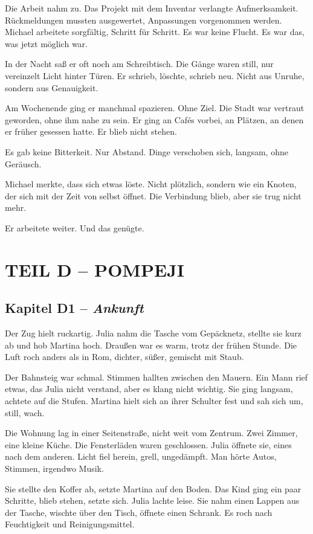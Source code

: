 \documentclass[
]{article}
\begin{document}
Die Arbeit nahm zu. Das Projekt mit dem Inventar verlangte Aufmerksamkeit. Rückmeldungen mussten ausgewertet, Anpassungen vorgenommen werden. Michael arbeitete sorgfältig, Schritt für Schritt. Es war keine Flucht. Es war das, was jetzt möglich war.

In der Nacht saß er oft noch am Schreibtisch. Die Gänge waren still, nur vereinzelt Licht hinter Türen. Er schrieb, löschte, schrieb neu. Nicht aus Unruhe, sondern aus Genauigkeit.

Am Wochenende ging er manchmal spazieren. Ohne Ziel. Die Stadt war vertraut geworden, ohne ihm nahe zu sein. Er ging an Cafés vorbei, an Plätzen, an denen er früher gesessen hatte. Er blieb nicht stehen.

Es gab keine Bitterkeit. Nur Abstand. Dinge verschoben sich, langsam, ohne Geräusch.

Michael merkte, dass sich etwas löste. Nicht plötzlich, sondern wie ein Knoten, der sich mit der Zeit von selbst öffnet. Die Verbindung blieb, aber sie trug nicht mehr.

Er arbeitete weiter. Und das genügte.

\section{TEIL D -- POMPEJI}\label{teil-d-pompeji}

\subsection{\texorpdfstring{Kapitel D1 -- \emph{Ankunft}}{Kapitel D1 -- Ankunft}}\label{kapitel-d1-ankunft}

Der Zug hielt ruckartig. Julia nahm die Tasche vom Gepäcknetz, stellte sie kurz ab und hob Martina hoch. Draußen war es warm, trotz der frühen Stunde. Die Luft roch anders als in Rom, dichter, süßer, gemischt mit Staub.

Der Bahnsteig war schmal. Stimmen hallten zwischen den Mauern. Ein Mann rief etwas, das Julia nicht verstand, aber es klang nicht wichtig. Sie ging langsam, achtete auf die Stufen. Martina hielt sich an ihrer Schulter fest und sah sich um, still, wach.

Die Wohnung lag in einer Seitenstraße, nicht weit vom Zentrum. Zwei Zimmer, eine kleine Küche. Die Fensterläden waren geschlossen. Julia öffnete sie, eines nach dem anderen. Licht fiel herein, grell, ungedämpft. Man hörte Autos, Stimmen, irgendwo Musik.

Sie stellte den Koffer ab, setzte Martina auf den Boden. Das Kind ging ein paar Schritte, blieb stehen, setzte sich. Julia lachte leise. Sie nahm einen Lappen aus der Tasche, wischte über den Tisch, öffnete einen Schrank. Es roch nach Feuchtigkeit und Reinigungsmittel.
\end{document}
